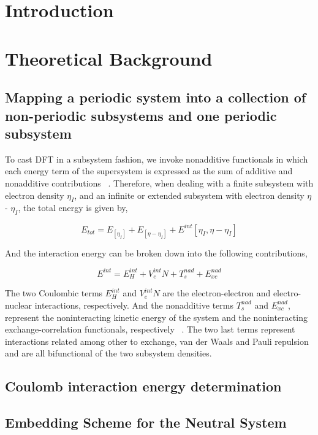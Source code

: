 \documentclass[12pt,a4paper]{article}
\begin{document}
\section{Introduction}

\section{Theoretical Background}

\subsection{Mapping a periodic system into a collection of non-periodic subsystems and one periodic subsystem}
To cast DFT in a subsystem fashion, we invoke nonadditive functionals in which each energy term of the supersystem is expressed as the sum of additive
and nonadditive contributions ~\cite{martyna1999reciprocal}. Therefore, when dealing with a finite subsystem with electron density $\eta_I$, and an
infinite or extended subsystem with electron density $\eta$ - $\eta_I$, the total energy is given by,

\begin{equation}
	E_{tot} = {E_[{\eta}_I]} + {E_[{\eta} - {\eta}_I]} + {E^{int}[{\eta}_I, {\eta} - {\eta}_I] } 
\end{equation}

And the interaction energy can be broken down into the following contributions,

\begin{equation}
	E^{int} = E^{int}_H + V^{int}_eN + T^{nad}_s + E^{nad}_{xc} 
\end{equation}

The two Coulombic terms $E^{int}_H$ and $V^{int}_eN$ are the electron-electron and electro-nuclear interactions, respectively. And the
nonadditive terms $T^{nad}_s$ and $E^{nad}_{xc}$, represent the noninteracting kinetic energy of the system and the noninteracting
exchange-correlation functionals, respectively ~\cite{krishtal2015subsystem}. The two last terms represent interactions related among other to exchange, van der Waals and Pauli repulsion and are all bifunctional of the two subsystem densities.

\subsection{Coulomb interaction energy determination}
\subsection{Embedding Scheme for the Neutral System}
\end{document}
